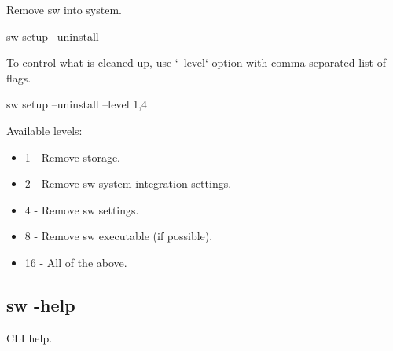 Remove sw into system.

\begin{command}
sw setup --uninstall
\end{command}

To control what is cleaned up, use `--level` option with comma separated list of flags.

\begin{command}
sw setup --uninstall --level 1,4
\end{command}

Available levels:
\begin{itemize}
\item 1 - Remove storage.
\item 2 - Remove sw system integration settings.
\item 4 - Remove sw settings.
\item 8 - Remove sw executable (if possible).
\item 16 - All of the above.
\end{itemize}


\subsection{sw -help}

CLI help.

